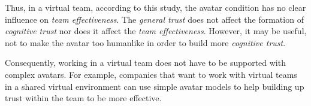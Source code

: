 \documentclass[sigchi]{acmart}
\begin{document}
Thus, in a virtual team, according to this study, the avatar condition has no clear influence on \textit{team effectiveness}. The \textit{general trust} does not affect the formation of \textit{cognitive trust} nor does it affect the \textit{team effectiveness}. However, it may be useful, not to make the avatar too humanlike in order to build more \textit{cognitive trust}.

Consequently, working in a virtual team does not have to be supported with complex avatars. For example, companies that want to work with virtual teams in a shared virtual environment can use simple avatar models to help building up trust within the team to be more effective.





\appendix
\end{document}
